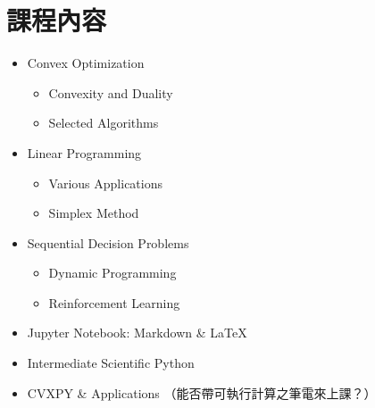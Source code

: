 \documentclass[11pt]{extarticle}
\begin{document}
\section*{課程內容}

\begin{itemize}[itemsep=0mm]
  \item Convex Optimization
    \vspace{-2mm}
    \begin{itemize}
      \item Convexity and Duality
      \item Selected Algorithms
    \end{itemize}
  \item Linear Programming
    \vspace{-2mm}
    \begin{itemize}
      \item Various Applications
      \item Simplex Method
    \end{itemize}
  \item Sequential Decision Problems
    \vspace{-2mm}
    \begin{itemize}
      \item Dynamic Programming 
      \item Reinforcement Learning 
    \end{itemize}
  \item Jupyter Notebook: Markdown \& \LaTeX{}
  \item Intermediate Scientific Python
  \item CVXPY \& Applications （能否帶可執行計算之筆電來上課？）
\end{itemize}

\newpage
\end{document}
